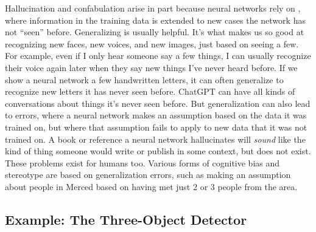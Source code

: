 Hallucination and confabulation arise in part because neural networks rely on , where information in the training data is extended to new cases the network has not ``seen'' before. Generalizing is usually helpful. It's what makes us so good at recognizing new faces, new voices, and new images, just based on seeing a few.  For example, even if I only hear someone say a few things, I can usually recognize their voice again later when they say new things I've never heard before. If we show a neural network a few handwritten letters, it can often generalize to recognize new letters it has never seen before.  ChatGPT can have all kinds of conversations about things it's never seen before. But generalization can also lead to errors, where a neural network makes an assumption based on the data it was trained on, but where that assumption fails to apply to new data that it was not trained on. A book or reference a neural network hallucinates will \emph{sound} like the kind of thing someone would write or publish in some context, but does not exist. These problems exist for humans too. Various forms of cognitive bias and stereotype are based on generalization errors, such as making an assumption about people in Merced based on having met just 2 or 3 people from the area.

\subsection{Example: The Three-Object Detector}

